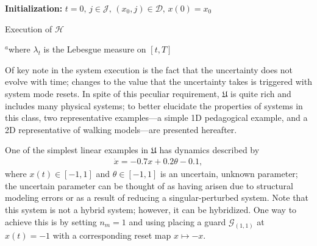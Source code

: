 \begin{algorithm}[!t]
\small
 {\bf Initialization:} $t=0,\,j\in \mathcal J,\,(x_0,j)\in \mathcal D,\,x(0)=x_0$\;
 \While{1}{
 {\em Let} $\theta$ be drawn according to $\mu_{\theta_j}$\;
 {\em Let} $\gamma\colon [t,T]\rightarrow \mathrm{M}_j$, abs. ct. st.\\\hspace{.2in}
 $\dot \gamma(s)=\tilde f(\gamma(s),\theta)$ $\lambda_t^{\text{\tiny a}}$-a.e., $s\in [t,T]$\\\hspace{.2in}
 $\gamma(t)=x(t)$\;
 $\Lambda_{(j,t)}:=\{r\in [t,T]| \exists (j,k)\in \mathcal E \text{ st. } (\gamma(r),\theta)\in \mathcal G_{(j,k)}\}$\;
 \eIf {$\Lambda_{(j,t)}\ne \emptyset$}{%
    $t':=\min \Lambda_{(j,t)}$, $k$ st. $\gamma(t')\in \pi_{x}\mathcal G_{(j,k)}$\\\hspace{.2in}
     $x(s)\leftarrow \gamma(s)$, $\forall s\in [t,t')$\\ \hspace{.2in}
    $t\leftarrow t',\,x(t')\leftarrow R_{(j,k)}(\gamma(t')),\,j\leftarrow k$
 }
 {
 $x(s)=\gamma(s),\,\forall s\in [t,T]$\;
 Stop\;
 }
 }
 \caption{Execution of $\mathcal H$}
 \label{alg:execution}
 $^a$where $\lambda_t$ is the Lebesgue measure on $[t,T]$
\end{algorithm}
Of key note in the system execution is the fact that the uncertainty does not evolve with time; changes to the value that the uncertainty takes is triggered with system mode resets. In spite of this peculiar requirement, $\mathfrak{U}$ is quite rich and includes many physical systems; to better elucidate the properties of systems in this class, two representative examples---a simple 1D pedagogical example, and a 2D representative of walking models---are presented hereafter.
\begin{example}
\label{example:1D}
One of the simplest linear examples in $\mathfrak{U}$ has dynamics described by
\begin{align}
	\dot x = -0.7x+0.2\theta-0.1,
\end{align}
where \mbox{$x(t)\in [-1,1]$} and $\theta\in [-1,1]$ is an uncertain, unknown parameter; the uncertain parameter can be thought of as having arisen due to structural modeling errors or as a result of reducing a singular-perturbed system. Note that this system is not a hybrid system; however, it can be hybridized. One way to achieve this is by setting $n_m=1$ and using placing a guard $\mathcal G_{(1,1)}$ at $x(t)=-1$ with a corresponding reset map $x\mapsto -x$.
\end{example}
